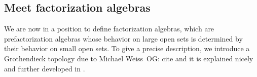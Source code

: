\documentclass[11pt]{amsart}
\def\owen#1{{\textcolor{violet!65!black}{OG: {#1}}}}
\begin{document}
%
%
%
%

\subsection{Meet factorization algebras}

We are now in a position to define factorization algebras,
which are prefactorization algebras whose behavior on large open sets is determined by their behavior on small open sets.
To give a precise description, we introduce a Grothendieck topology due to Michael Weiss~\owen{cite  \cite{Weiss} and it is explained nicely and further developed in \cite{BoavidaWeiss}}.
\end{document}
